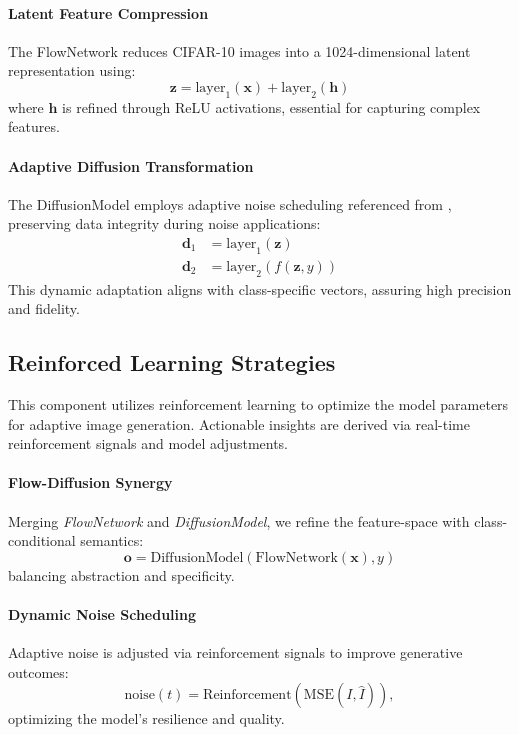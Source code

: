 \documentclass{article} %
\begin{document}
\paragraph{Latent Feature Compression}
The FlowNetwork reduces CIFAR-10 images into a 1024-dimensional latent representation using:
\begin{equation}
\mathbf{z} = \text{layer}_1(\mathbf{x}) + \text{layer}_2(\mathbf{h})
\end{equation}
where $\mathbf{h}$ is refined through ReLU activations, essential for capturing complex features.

\paragraph{Adaptive Diffusion Transformation}
The DiffusionModel employs adaptive noise scheduling referenced from \citep{Song2021}, preserving data integrity during noise applications:
\begin{align}
\mathbf{d}_1 &= \text{layer}_1(\mathbf{z})\\
\mathbf{d}_2 &= \text{layer}_2(f(\mathbf{z}, y))
\end{align}
This dynamic adaptation aligns with class-specific vectors, assuring high precision and fidelity.

\subsection{Reinforced Learning Strategies}
This component utilizes reinforcement learning to optimize the model parameters for adaptive image generation. Actionable insights are derived via real-time reinforcement signals and model adjustments.

\paragraph{Flow-Diffusion Synergy}
Merging \emph{FlowNetwork} and \emph{DiffusionModel}, we refine the feature-space with class-conditional semantics:
\begin{equation}
\mathbf{o} = \text{DiffusionModel}(\text{FlowNetwork}(\mathbf{x}), y)
\end{equation}
balancing abstraction and specificity.

\paragraph{Dynamic Noise Scheduling}
Adaptive noise is adjusted via reinforcement signals to improve generative outcomes:
\begin{equation}
\text{noise}(t) = \text{Reinforcement}(\text{MSE}(I, \hat{I})),
\end{equation}
optimizing the model's resilience and quality.
\end{document}
